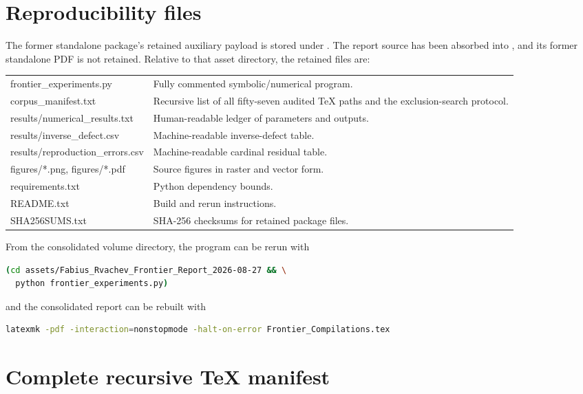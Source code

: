 \documentclass[11pt]{article}
\numberwithin{equation}{section}
\theoremstyle{definition}
\theoremstyle{remark}
\begin{document}
\section{Reproducibility files}
\label{p4:app:reproducibility}
The former standalone package's retained auxiliary payload is stored under
.  The report source has been
absorbed into , and its former standalone PDF is not retained.
Relative to that asset directory, the retained files are:
\begin{center}
\begin{tabularx}{0.96\textwidth}{@{}>{\footnotesize\ttfamily\raggedright\arraybackslash}p{}X@{}}
\toprule
frontier\_experiments.py & Fully commented symbolic/numerical program.\\
corpus\_manifest.txt & Recursive list of all fifty-seven audited TeX paths and the exclusion-search protocol.\\
results/numerical\_results.txt & Human-readable ledger of parameters and outputs.\\
results/inverse\_defect.csv & Machine-readable inverse-defect table.\\
results/reproduction\_errors.csv & Machine-readable cardinal residual table.\\
figures/*.png, figures/*.pdf & Source figures in raster and vector form.\\
requirements.txt & Python dependency bounds.\\
README.txt & Build and rerun instructions.\\
SHA256SUMS.txt & SHA-256 checksums for retained package files.\\
\bottomrule
\end{tabularx}
\end{center}
From the consolidated volume directory, the program can be rerun with
\begin{lstlisting}[style=code,language=bash]
(cd assets/Fabius_Rvachev_Frontier_Report_2026-08-27 && \
  python frontier_experiments.py)
\end{lstlisting}
and the consolidated report can be rebuilt with
\begin{lstlisting}[style=code,language=bash]
latexmk -pdf -interaction=nonstopmode -halt-on-error Frontier_Compilations.tex
\end{lstlisting}

\section{Complete recursive TeX manifest}
\label{p4:app:manifest}

\end{document}

